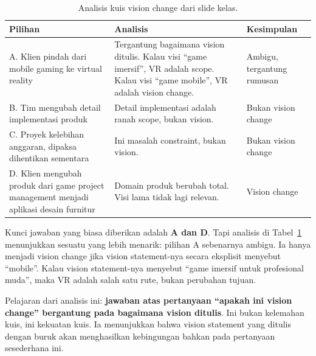 \documentclass[11pt,a4paper]{article}
\begin{document}
\begin{table}[H]
	\centering
	\caption{Analisis kuis vision change dari slide kelas.}
	\label{tab:vision-quiz}
	\footnotesize
	\begin{tabularx}{\textwidth}{l X X}
		\toprule
		Pilihan                                                                                & Analisis                                                                                                                                & Kesimpulan                 \\
		\midrule
		A. Klien pindah dari mobile gaming ke virtual reality                                  & Tergantung bagaimana vision ditulis. Kalau visi ``game imersif'', VR adalah scope. Kalau visi ``game mobile'', VR adalah vision change. & Ambigu, tergantung rumusan \\
		B. Tim mengubah detail implementasi produk                                             & Detail implementasi adalah ranah scope, bukan vision.                                                                                   & Bukan vision change        \\
		C. Proyek kelebihan anggaran, dipaksa dihentikan sementara                             & Ini masalah constraint, bukan vision.                                                                                                   & Bukan vision change        \\
		D. Klien mengubah produk dari game project management menjadi aplikasi desain furnitur & Domain produk berubah total. Visi lama tidak lagi relevan.                                                                              & Vision change              \\
		\bottomrule
	\end{tabularx}
\end{table}

Kunci jawaban yang biasa diberikan adalah \textbf{A dan D}. Tapi analisis di Tabel~\ref{tab:vision-quiz} menunjukkan sesuatu yang lebih menarik: pilihan A sebenarnya ambigu. Ia hanya menjadi vision change jika vision statement-nya secara eksplisit menyebut ``mobile''. Kalau vision statement-nya menyebut ``game imersif untuk profesional muda'', maka VR adalah salah satu rute, bukan perubahan tujuan.

Pelajaran dari analisis ini: \textbf{jawaban atas pertanyaan ``apakah ini vision change'' bergantung pada bagaimana vision ditulis}. Ini bukan kelemahan kuis, ini kekuatan kuis. Ia menunjukkan bahwa vision statement yang ditulis dengan buruk akan menghasilkan kebingungan bahkan pada pertanyaan sesederhana ini.
\end{document}
